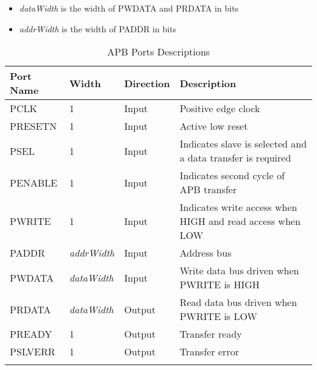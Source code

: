 \begin{itemize}[noitemsep]
  \item \textit{dataWidth} is the width of PWDATA and PRDATA in bits
  \item \textit{addrWidth} is the width of PADDR in bits
\end{itemize}
 
\renewcommand*{\arraystretch}{1.4}
\begin{longtable}[H]{
  | p{}
  | p{}
  | p{}
  | p{} |
  }
  \hline
  \textbf{Port Name} &   
  \textbf{Width} &   
  \textbf{Direction} &   
  \textbf{Description} \\ \hline \hline

  PCLK &       
  1 &       
  Input &       
  Positive edge clock \\ \hline

  PRESETN &       
  1 &       
  Input &       
  Active low reset \\ \hline

  PSEL &       
  1 & 
  Input &       
  Indicates slave is selected and a data transfer is required \\ \hline

  PENABLE &        
  1 & 
  Input &       
  Indicates second cycle of APB transfer \\ \hline

  PWRITE &        
  1 & 
  Input &       
  Indicates write access when HIGH and read access when LOW\\ \hline

  PADDR &      
  \textit{addrWidth} & 
  Input &     
  Address bus \\ \hline

  PWDATA &      
  \textit{dataWidth} & 
  Input &     
  Write data bus driven when PWRITE is HIGH\\ \hline

  PRDATA &      
  \textit{dataWidth} & 
  Output &     
  Read data bus driven when PWRITE is LOW\\ \hline
 
  PREADY &        
  1 & 
  Output &       
  Transfer ready \\ \hline

  PSLVERR &        
  1 & 
  Output &       
  Transfer error \\ \hline

  \caption{APB Ports Descriptions}\label{table:interface}
\end{longtable}

